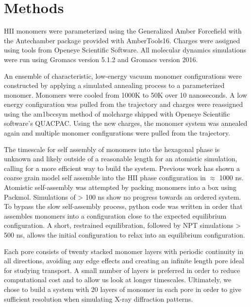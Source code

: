 \section{Methods}
	
HII monomers were parameterized using the Generalized Amber Forcefield
with the Antechamber package provided with AmberTools16. Charges were
assigned using tools from Openeye Scientific Software. All molecular dynamics
simulations were run using Gromacs version 5.1.2 and Gromacs version 2016.
	
An ensemble of characteristic, low-energy vacuum monomer configurations
were constructed by applying a simulated annealing process to a
parameterized monomer. Monomers were cooled from 1000K to 50K over 10
nanoseconds. A low energy configuration was pulled from the trajectory 
and charges were reassigned using the am1bccsym method of molcharge
shipped with Openeye Scientific software's QUACPAC. Using the new
charges, the monomer system was annealed again and multiple monomer
configurations were pulled from the trajectory.
	
The timescale for self assembly of monomers into the hexagonal phase is
unknown and likely outside of a reasonable length for an atomistic
simulation, calling for a more efficient way to build the system. 
Previous work has shown a coarse grain model self assemble into the HII
phase configuration in $\approx$ 1000 ns. Atomistic self-assembly was 
attempted by packing monomers into a box using Packmol. Simulations of >
100 ns show no progress towards an ordered system. To bypass the 
slow self-assembly process, python code was written in order that 
assembles monomers into a configuration close to the expected 
equilibrium configuration. A short, restrained equilibration, followed 
by NPT simulations > 500 ns, allows the initial configuration to relax
into an equilibrium configuration.

Each pore consists of twenty stacked monomer layers with periodic 
continuity in all directions, avoiding any edge effects and creating an
infinite length pore ideal for studying transport. A small number of
layers is preferred in order to reduce computational cost and to allow
us look at longer timescales. Ultimately, we chose to build a system
with 20 layers of monomer in each pore in order to give sufficient
resolution when simulating X-ray diffraction patterns.


